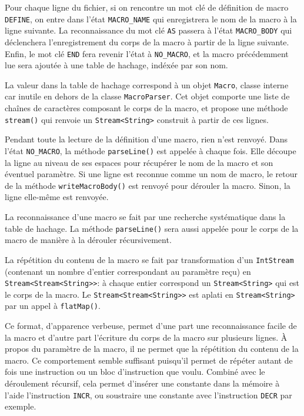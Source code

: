 \documentclass{article}
\begin{document}
        Pour chaque ligne du fichier, si on rencontre un mot clé de définition de macro \texttt{DEFINE}, on entre dans l'état \texttt{MACRO\_NAME} qui enregistrera le nom de la macro à la ligne suivante.
        La reconnaissance du mot clé \texttt{AS} passera à l'état \texttt{MACRO\_BODY} qui déclenchera l'enregistrement du corps de la macro à partir de la ligne suivante.
        Enfin, le mot clé \texttt{END} fera revenir l'état à \texttt{NO\_MACRO}, et la macro précédemment lue sera ajoutée à une table de hachage, indéxée par son nom.
        
        La valeur dans la table de hachage correspond à un objet \texttt{Macro}, classe interne car inutile en dehors de la classe \texttt{MacroParser}.
        Cet objet comporte une liste de chaînes de caractères composant le corps de la macro, et propose une méthode \texttt{stream()} qui renvoie un \texttt{Stream<String>} construit à partir de ces lignes.

        Pendant toute la lecture de la définition d'une macro, rien n'est renvoyé.
        Dans l'état \texttt{NO\_MACRO}, la méthode \texttt{parseLine()} est appelée à chaque fois. Elle découpe la ligne au niveau de ses espaces pour récupérer le nom de la macro et son éventuel paramètre. Si une ligne est reconnue comme un nom de macro, le retour de la méthode \texttt{writeMacroBody()} est renvoyé pour dérouler la macro.
        Sinon, la ligne elle-même est renvoyée.
        
    La reconnaissance d'une macro se fait par une recherche systématique dans la table de hachage. La méthode \texttt{parseLine()} sera aussi appelée pour le corps de la macro de manière à la dérouler récursivement.

    La répétition du contenu de la macro se fait par transformation d'un \texttt{IntStream} (contenant un nombre d'entier correspondant au paramètre reçu) en \texttt{Stream<Stream<String>>}: à chaque entier correspond un \texttt{Stream<String>} qui est le corps de la macro. Le \texttt{Stream<Stream<String>>} est aplati en \texttt{Stream<String>} par un appel à \texttt{flatMap()}.

        Ce format, d'apparence verbeuse, permet d'une part une reconnaissance facile de la macro et d'autre part l'écriture du corps de la macro sur plusieurs lignes.
        À propos du paramètre de la macro, il ne permet que la répétition du contenu de la macro. Ce comportement semble suffisant puisqu'il permet de répéter autant de fois une instruction ou un bloc d'instruction que voulu. Combiné avec le déroulement récursif, cela permet d'insérer une constante dans la mémoire à l'aide l'instruction \texttt{INCR}, ou soustraire une constante avec l'instruction \texttt{DECR} par exemple.
\end{document}
